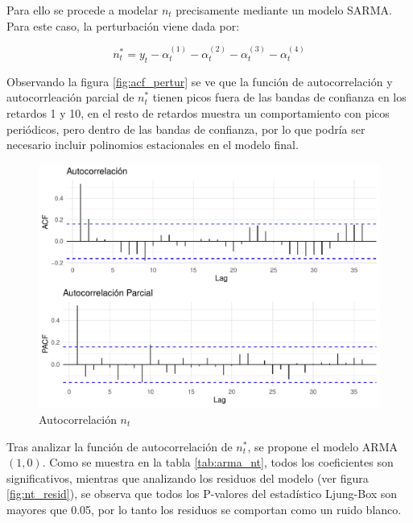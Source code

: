 \documentclass[12pt,oneside]{book}\usepackage[]{graphicx}\usepackage[]{color}
\makeatletter
\def\maxwidth{ %
  \ifdim\Gin@nat@width>\linewidth
    \linewidth
  \else
    \Gin@nat@width
  \fi
}
\newenvironment{knitrout}{}{} %
\theoremstyle{definition} %
\makeatother
\begin{document}
Para ello se procede a modelar $n_t$ precisamente mediante un modelo SARMA. Para este caso, la perturbación viene dada por:

$$n_t^{*} = y_t -  \alpha_t^{(1)}-\alpha_t^{(2)}-\alpha_t^{(3)}-\alpha_t^{(4)}$$

Observando la figura \ref{fig:acf_pertur} se ve que la función de autocorrelación y autocorrleación parcial de $n^{*}_t$ tienen picos fuera de las bandas de confianza en los retardos 1 y 10, en el resto de retardos muestra un comportamiento con picos periódicos, pero dentro de las bandas de confianza, por lo que podría ser necesario incluir polinomios estacionales en el modelo final. 

\begin{knitrout}
\color{fgcolor}\begin{figure}[H]

{\centering \includegraphics[width=\maxwidth]{figure/unnamed-chunk-45-1} 

}

\caption{\label{fig:acf_pertur} Autocorrelación $n_t$ }\label{fig:unnamed-chunk-45}
\end{figure}


\end{knitrout}


Tras analizar la función de autocorrelación de $n_t^{*}$, se propone el modelo ARMA$(1,0)$. Como se muestra en la tabla \ref{tab:arma_nt}, todos los coeficientes son significativos, mientras que analizando los residuos del modelo (ver figura \ref{fig:nt_resid}), se observa que todos los P-valores del estadístico Ljung-Box son mayores que 0.05, por lo tanto los residuos se comportan como un ruido blanco.
\end{document}
